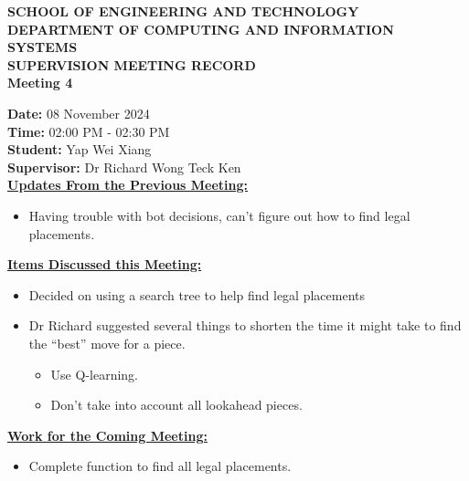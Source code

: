 \documentclass[a4paper, 12pt]{report}
\begin{document}
	
	\onehalfspacing
	
	\begin{center}
		
		\textbf{\large SCHOOL OF ENGINEERING AND TECHNOLOGY}	\\
		\textbf{\small DEPARTMENT OF COMPUTING AND INFORMATION SYSTEMS} \\
		\vspace{1cm}
		\textbf{\LARGE SUPERVISION MEETING RECORD}\\
		\textbf{\normalsize Meeting 4}	%
		
	\end{center}
	
	\noindent			%
	\textbf{Date: } 08 November 2024 \\	%
	\textbf{Time: } 02:00 PM - 02:30 PM \\	%
	\textbf{Student: } Yap Wei Xiang \\
	\textbf{Supervisor: } Dr Richard Wong Teck Ken \\
	
	\noindent			%
	\textbf{\underline{Updates From the Previous Meeting: }}
	\begin{itemize}	%
		\item Having trouble with bot decisions, can't figure out how to find legal placements.
	\end{itemize}
	
	\noindent			%
	\textbf{\underline{Items Discussed this Meeting: }}
	\begin{itemize}	%
		\item Decided on using a search tree to help find legal placements
		\item Dr Richard suggested several things to shorten the time it might take to find the ``best'' move for a piece.
		\begin{itemize}
			\item Use Q-learning.
			\item Don't take into account all lookahead pieces.
		\end{itemize}
	\end{itemize}
	
	\noindent			%
	\textbf{\underline{Work for the Coming Meeting: }}
	\begin{itemize}	%
		\item Complete function to find all legal placements.
	\end{itemize}
	
\end{document}
